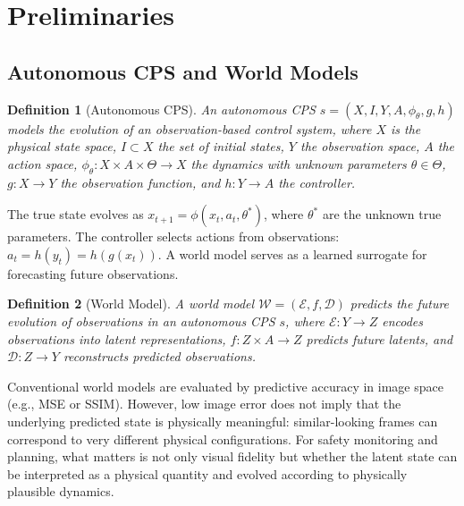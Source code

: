 \documentclass[preprint,12pt]{elsarticle}
\newtheorem{definition}{Definition}
\begin{document}
\section{Preliminaries}\label{sec:preliminaries}

\subsection{Autonomous CPS and World Models}

\begin{definition}[Autonomous CPS]
An \emph{autonomous CPS} $s = (X, I, Y, A, \phi_{\theta}, g, h)$ models the
evolution of an observation-based control system, where $X$ is the physical
state space, $I \subset X$ the set of initial states, $Y$ the observation space,
$A$ the action space, $\phi_{\theta}: X \times A \times \Theta \rightarrow X$ the
dynamics with unknown parameters $\theta \in \Theta$, $g: X \rightarrow Y$ the
observation function, and $h: Y \rightarrow A$ the controller.
\end{definition}

The true state evolves as $x_{t+1} = \phi(x_t, a_t, \theta^*)$, where $\theta^*$
are the unknown true parameters.
The controller selects actions from observations: $a_t = h(y_t) = h(g(x_t))$.
A world model serves as a learned surrogate for forecasting future observations.

\begin{definition}[World Model]
A \emph{world model} $\mathcal{W} = (\mathcal{E}, f, \mathcal{D})$ predicts the
future evolution of observations in an autonomous CPS $s$, where
$\mathcal{E}: Y \rightarrow Z$ encodes observations into latent representations,
$f: Z \times A \rightarrow Z$ predicts future latents, and
$\mathcal{D}: Z \rightarrow Y$ reconstructs predicted observations.
\end{definition}

Conventional world models are evaluated by predictive accuracy in image space
(e.g., MSE or SSIM).
However, low image error does not imply that the underlying predicted state is
physically meaningful: similar-looking frames can correspond to very different
physical configurations.
For safety monitoring and planning, what matters is not only visual fidelity but
whether the latent state can be interpreted as a physical quantity and evolved
according to physically plausible dynamics.
\end{document}
